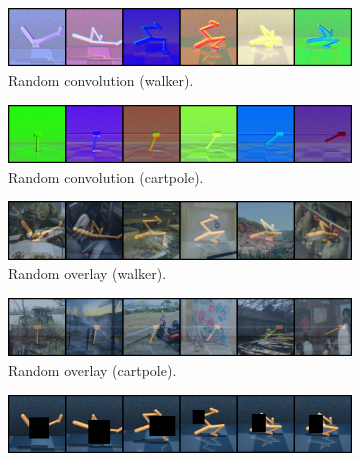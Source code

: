 \begin{figure}[H]
\begin{subfigure}[b]{0.48\textwidth}
        \centering
        \includegraphics[width=\textwidth]{figures/visualizations/grid_conv.png}
        \caption{Random convolution (walker).}
        \vspace{0.1in}
    \end{subfigure}
    \begin{subfigure}[b]{0.48\textwidth}
        \centering
        \includegraphics[width=\textwidth]{figures/visualizations/grid_cartpole_conv.png}
        \caption{Random convolution (cartpole).}
        \vspace{0.1in}
    \end{subfigure}
    \begin{subfigure}[b]{0.48\textwidth}
        \centering
        \includegraphics[width=\textwidth]{figures/visualizations/grid_overlay.png}
        \caption{Random overlay (walker).}
        \vspace{0.1in}
    \end{subfigure}
    \begin{subfigure}[b]{0.48\textwidth}
        \centering
        \includegraphics[width=\textwidth]{figures/visualizations/grid_cartpole_overlay.png}
        \caption{Random overlay (cartpole).}
        \vspace{0.1in}
    \end{subfigure}
    \begin{subfigure}[b]{0.48\textwidth}
        \centering
        \includegraphics[width=\textwidth]{figures/visualizations/grid_cutout.png}

\end{subfigure}
\end{figure}
